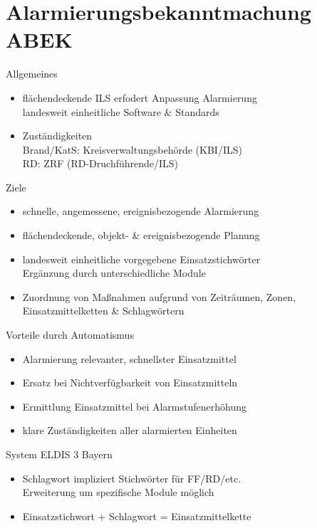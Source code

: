 \section{Alarmierungsbekanntmachung ABEK}
\begin{sectionbox}{Allgemeines}
    \begin{itemize}
        \item flächendeckende ILS erfodert Anpassung Alarmierung\\
        \ra landesweit einheitliche Software \& Standards
        \item Zuständigkeiten\\
        \ra Brand/KatS: Kreisverwaltungsbehörde (KBI/ILS)\\
        \ra RD: ZRF (RD-Druchführende/ILS)
    \end{itemize}
\end{sectionbox}
\begin{sectionbox}{Ziele}
    \begin{itemize}
        \item schnelle, angemessene, ereignisbezogende Alarmierung
        \item flächendeckende, objekt- \& ereignisbezogende Planung
        \item landesweit einheitliche vorgegebene Einsatzstichwörter\\
        \ra Ergänzung durch unterschiedliche Module
        \item Zuordnung von Maßnahmen aufgrund von Zeiträumen, Zonen, Einsatzmittelketten \& Schlagwörtern
    \end{itemize}
\end{sectionbox}
\begin{sectionbox}{Vorteile durch Automatismus}
    \begin{itemize}
        \item Alarmierung relevanter, schnellster Einsatzmittel
        \item Ersatz bei Nichtverfügbarkeit von Einsatzmitteln
        \item Ermittlung Einsatzmittel bei Alarmstufenerhöhung
        \item klare Zuständigkeiten aller alarmierten Einheiten
    \end{itemize}
\end{sectionbox}
\begin{sectionbox}{System ELDIS 3 Bayern}
    \begin{itemize}
        \item Schlagwort impliziert Stichwörter für FF/RD/etc.\\
        \ra Erweiterung um spezifische Module möglich
        \item Einsatzstichwort + Schlagwort = Einsatzmittelkette
    \end{itemize}
\end{sectionbox}